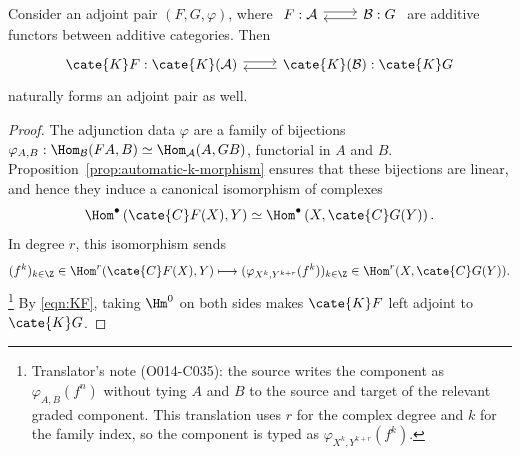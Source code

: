 \begin{proposition}\label{prop:KF-adjoint}
	Consider an adjoint pair $(F,G,\varphi)$, where
	$\begin{tikzcd}
		F: \mathcal{A} \arrow[shift left, r] & \mathcal{B} \arrow[shift left, l] : G
	\end{tikzcd}$
	are additive functors between additive categories. Then
	\[\begin{tikzcd}
		\cate{K}F: \cate{K}(\mathcal{A}) \arrow[shift left, r] & \cate{K}(\mathcal{B}) \arrow[shift left, l] : \cate{K}G
	\end{tikzcd}\]
	naturally forms an adjoint pair as well.
\end{proposition}
\begin{proof}
	The adjunction data $\varphi$ are a family of bijections
	$\varphi_{A,B}:\Hom_{\mathcal{B}}(FA,B)\simeq
	\Hom_{\mathcal{A}}(A,GB)$, functorial in $A$ and $B$.
	Proposition~\ref{prop:automatic-k-morphism} ensures that these bijections
	are linear, and hence they induce a canonical isomorphism of complexes
	\[ \Hom^\bullet\left( \cate{C}F(X), Y \right) \simeq \Hom^\bullet\left( X, \cate{C}G(Y) \right). \]
	In degree $r$, this isomorphism sends
	\[
		(f^k)_{k\in\Z}\in\Hom^r(\cate{C}F(X),Y)
		\longmapsto
		(\varphi_{X^k,Y^{k+r}}(f^k))_{k\in\Z}
		\in\Hom^r(X,\cate{C}G(Y)).
	\]%
	\footnote{Translator's note (O014-C035): the source writes the component
	as $\varphi_{A,B}(f^n)$ without tying $A$ and $B$ to the source and target
	of the relevant graded component. This translation uses $r$ for the
	complex degree and $k$ for the family index, so the component is typed as
	$\varphi_{X^k,Y^{k+r}}(f^k)$.}
	By \eqref{eqn:KF}, taking $\Hm^0$ on both sides makes $\cate{K}F$ left
	adjoint to $\cate{K}G$.
\end{proof}
